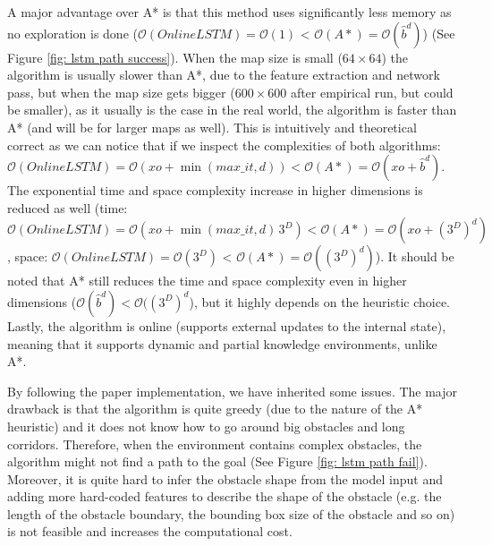 A major advantage over A* is that this method uses significantly less memory as no exploration is done ($\mathcal{O}(OnlineLSTM) = \mathcal{O}(1)$ < $\mathcal{O}(A*) =  \mathcal{O}(\hat{b}^d)$) (See Figure \ref{fig: lstm path success}). When the map size is small ($64 \times 64$) the algorithm is usually slower than A*, due to the feature extraction and network pass, but when the map size gets bigger ($600 \times 600$ after empirical run, but could be smaller), as it usually is the case in the real world, the algorithm is faster than A* (and will be for larger maps as well). This is intuitively and theoretical correct as we can notice that if we inspect the complexities of both algorithms: $\mathcal{O}(Online LSTM) = \mathcal{O}(xo + \min(max\_it, d)) < \mathcal{O}(A*) = \mathcal{O}(xo + \hat{b}^d)$. The exponential time and space complexity increase in higher dimensions is reduced as well (time: $\mathcal{O}(Online LSTM) = \mathcal{O}(xo + \min(max\_it, d)\,3^D) < \mathcal{O}(A*) = \mathcal{O}(xo + (3^D)^d)$, space: $\mathcal{O}(OnlineLSTM) = \mathcal{O}(3^D)$ < $\mathcal{O}(A*) = \mathcal{O}((3^D)^d)$). It should be noted that A* still reduces the time and space complexity even in higher dimensions ($\mathcal{O}(\hat{b}^d) < \mathcal{O}((3^D)^d$), but it highly depends on the heuristic choice. Lastly, the algorithm is online (supports external updates to the internal state), meaning that it supports dynamic and partial knowledge environments, unlike A*.

By following the paper implementation, we have inherited some issues. The major drawback is that the algorithm is quite greedy (due to the nature of the A* heuristic) and it does not know how to go around big obstacles and long corridors. Therefore, when the environment contains complex obstacles, the algorithm might not find a path to the goal (See Figure \ref{fig: lstm path fail}). Moreover, it is quite hard to infer the obstacle shape from the model input and adding more hard-coded features to describe the shape of the obstacle (e.g. the length of the obstacle boundary, the bounding box size of the obstacle and so on) is not feasible and increases the computational cost.

\pagebreak


